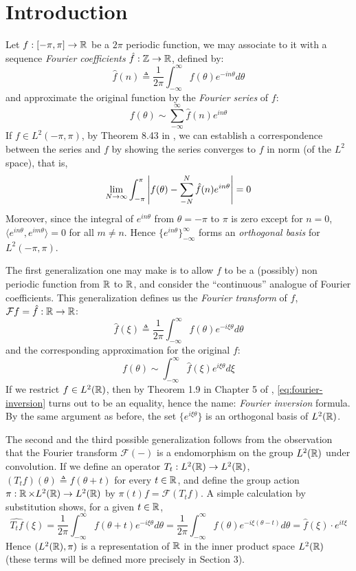 \section{Introduction}

Let $f : [-\pi,\pi] \to \operatorname{\mathbb{R}}$ be a $2\pi$ periodic function, we may associate to it with a
sequence \emph{Fourier coefficients} $\hat{f} : \operatorname{\mathbb{Z}} \to \operatorname{\mathbb{R}}$, defined by:
\[
  \hat{f}(n) \triangleq \frac{1}{2\pi} \int_{-\infty}^{\infty} f(\theta) e^{-in\theta} d\theta
\]
and approximate the original function by the \emph{Fourier series} of $f$:
\[
  f(\theta) \sim \sum_{-\infty}^{\infty} \hat{f}(n) e^{in\theta}
\]
If $f \in L^2(-\pi, \pi)$, by Theorem 8.43 in \cite{folland}, we can establish a
correspondence between the series and $f$ by showing the series converges to $f$
in norm (of the $L^2$ space), that is,
\[
  \lim_{N \to \infty} \int_{-\pi}^{\pi} \left|f(\theta) - \sum_{-N}^{N} \hat{f}(n)
    e^{in\theta}\right| = 0
\]
Moreover, since the integral of $e^{in\theta}$ from $\theta = -\pi$ to $\pi$ is zero
except for $n = 0$, $\langle e^{in\theta}, e^{im\theta} \rangle = 0$ for all $m
\neq n$. Hence $\{e^{in\theta}\}_{-\infty}^{\infty}$ forms an \emph{orthogonal
  basis} for $L^2(-\pi,\pi)$.

The first generalization one may make is to allow $f$ to be a (possibly)
non periodic function from $\operatorname{\mathbb{R}}$ to $\operatorname{\mathbb{R}}$, and consider the ``continuous''
analogue of Fourier coefficients.  This generalization defines us the
\emph{Fourier transform} of $f$, $\mathcal{F}f = \hat{f} : \operatorname{\mathbb{R}} \to \operatorname{\mathbb{R}}$:
\[
  \hat{f}(\xi) \triangleq \frac{1}{2\pi} \int_{-\infty}^{\infty} f(\theta)
  e^{-i\xi\theta} d\theta
\]
and the corresponding approximation for the original $f$:
\begin{equation}
  \label{eq:fourier-inversion}
  f(\theta) \sim \int_{-\infty}^{\infty} \hat{f}(\xi) e^{i\xi\theta} d\xi
\end{equation}
If we restrict $f \in L^2(\operatorname{\mathbb{R}})$, then by Theorem 1.9 in Chapter 5 of
\cite{stein2011fourier}, \cref{eq:fourier-inversion} turns out to be an
equality, hence the name: \emph{Fourier inversion} formula. By the same argument
as before, the set $\{e^{i\xi\theta}\}$ is an orthogonal basis of $L^2(\operatorname{\mathbb{R}})$.

The second and the third possible generalization follows from the observation
that the Fourier transform $\mathcal{F}(-)$ is a endomorphism on the group
$L^2(\operatorname{\mathbb{R}})$ under convolution.  If we define an operator $T_t : L^2(\operatorname{\mathbb{R}}) \to
L^2(\operatorname{\mathbb{R}})$, $(T_tf)(\theta) \triangleq f(\theta + t)$ for every $t \in \operatorname{\mathbb{R}}$, and
define the group action $\pi : \operatorname{\mathbb{R}} \times L^2(\operatorname{\mathbb{R}}) \to L^2(\operatorname{\mathbb{R}})$ by $\pi(t)f =
\mathcal{F}(T_tf)$. A simple calculation by substitution shows, for a given $t
\in \operatorname{\mathbb{R}}$,
\[
  \widehat{T_t f}(\xi)
  = \frac{1}{2\pi} \int_{-\infty}^{\infty} f(\theta + t) e^{-i\xi\theta} d\theta
  = \frac{1}{2\pi} \int_{-\infty}^{\infty} f(\theta) e^{-i\xi(\theta - t)} d\theta
  = \hat{f}(\xi) \cdot e^{it\xi}
\]
Hence $(L^2(\operatorname{\mathbb{R}}), \pi)$ is a representation of $\operatorname{\mathbb{R}}$ in the inner product space
$L^2(\operatorname{\mathbb{R}})$ (these terms will be defined more precisely in Section 3).

